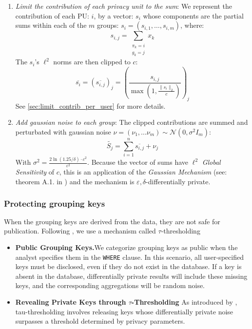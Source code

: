 \documentclass[letterpaper]{article} %
\begin{document}
\begin{enumerate}
	\item \emph{Limit the contribution of each \emph{privacy unit} to the sum}:
	We represent the contribution of each PU: $i$, by a vector: $s_i$ whose components are the partial sums within each of the $m$ groups: $s_i = \left(s_{i,1},\ldots, s_{i,m}\right)$, where:
    $$s_{i,j} = \sum_{\substack{\pi_k = i\\g_k = j}}x_k$$
    The $s_i$'s $\ell^2$ norms are then clipped to $c$:
    $$\overline{s_i} = \left(\overline{s_{i,j}}\right)_j = \left(\frac{s_{i,j}}{\max\left(1, \frac{\|s_i\|_2}{c}\right)}\right)_j$$
    See \ref{sec:limit_contrib_per_user} for more details.

	\item \emph{Add gaussian noise to each group}:
	The clipped contributions are summed and perturbated with gaussian noise $\nu = \left(\nu_1,\ldots \nu_m\right) \sim \mathcal{N}\left(0, \sigma^2I_m\right)$:
    $$\widetilde{S_j} = \sum_{i=1}^n \overline{s_{i,j}} + \nu_j$$
    With $\sigma^2={\frac {2\ln(1.25/\delta )\cdot c^{2}}{\varepsilon ^{2}}}$.
    Because the vector of sums have $\ell^2$ \emph{Global Sensitivity} of $c$, this is an application of the \emph{Gaussian Mechanism} (see: theorem A.1. in \cite{dwork2014algorithmic}) and the mechanism is $\varepsilon, \delta$-differentially private.
\end{enumerate}

\subsubsection{Protecting grouping keys}

When the grouping keys are derived from the data, they are not safe for publication.
Following \cite{korolova2009releasing, wilson2019differentially}, we use a mechanism called \emph{}$\tau$-thresholding

\begin{itemize}
	\item \textbf{Public Grouping Keys.}We categorize grouping keys as public when the analyst specifies them in the \texttt{WHERE} clause.
	In this scenario, all user-specified keys must be disclosed, even if they do not exist in the database.
	If a key is absent in the database, differentially private results will include these missing keys, and the corresponding aggregations will be random noise.
	\item \textbf{Revealing Private Keys through $\tau$-Thresholding}
	As introduced by \citeauthor{wilson2019differentially}, tau-thresholding involves releasing keys whose differentially private noise surpasses a threshold determined by privacy parameters.
\end{itemize}
\end{document}
